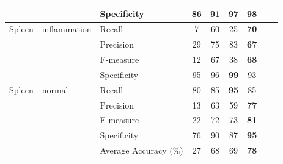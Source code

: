 \begin{table}[t!]
\begin{tabular}{|p{1.5in}|p{1.5in}|c|c|c|c|c|c|}
        &   Specificity &   86  &  91  &   97  & \textbf{98}\\
        \hline
        Spleen - inflammation    &    Recall    &    7    &    60    &    25    &\textbf{    70    }\\
        &    Precision    &    29    &    75    &    83    &\textbf{    67    }\\
        &    F-measure    &    12    &    67    &    38    &\textbf{    68    }\\
        &   Specificity &   95  &  96  &   \textbf{99}  & 93\\
        \hline
        Spleen - normal    &    Recall    &    80    &    85    &\textbf{    95    }&    85    \\
        &    Precision    &    13    &    63    &    59    &\textbf{    77    }\\
        &    F-measure    &    22    &    72    &    73    &\textbf{    81    }\\
        &   Specificity &   76  &  90  &   87  & \textbf{95}\\
        \hline
    & Average Accuracy ($\%$) &  27 & 68 & 69 & \textbf{78}\\
    \hline    
    \end{tabular}
\end{table}
